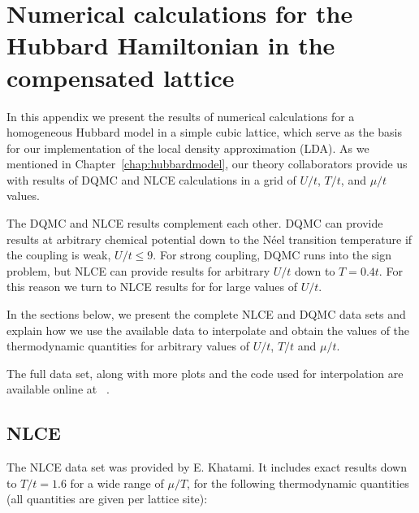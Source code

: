 
\chapter{Numerical calculations for the Hubbard Hamiltonian in the compensated
lattice}
\label{app:numerical}


In this appendix we present the results of numerical calculations for a
homogeneous Hubbard model in a simple cubic lattice, which serve as the basis
for our implementation of the local density approximation (LDA).  As we
mentioned in Chapter~\ref{chap:hubbardmodel}, our theory collaborators provide
us with results of DQMC and NLCE calculations in a grid of $U/t$, $T/t$, and
$\mu/t$ values.    

The DQMC and NLCE results complement each other.  DQMC can provide results at
arbitrary chemical potential down to the N\'{e}el transition temperature if the
coupling is weak, $U/t\leq 9$.   For strong coupling, DQMC runs into the sign
problem, but NLCE can provide results for arbitrary $U/t$ down to $T=0.4t$.
For this reason we turn to NLCE results for for large values of $U/t$. 

In the sections below, we present the complete NLCE and DQMC data sets and
explain how we use the available data to interpolate and obtain the values of
the thermodynamic quantities for arbitrary values of $U/t$, $T/t$ and $\mu/t$. 

The full data set, along with more plots and the code used for interpolation
are available online at ~\cite{PedroMDuarte:12780}. 
 

\section{NLCE} 
 
The NLCE data set was provided by E. Khatami.   It includes exact results down
to $T/t=1.6$ for a wide range of $\mu/T$, for the following thermodynamic
quantities (all quantities are given per lattice site):

